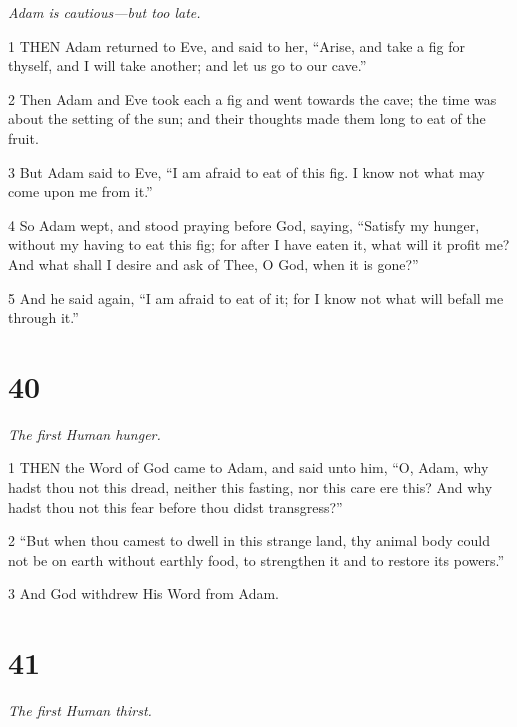 \par \textit{Adam is cautious—but too late.}

\par 1 THEN Adam returned to Eve, and said to her, “Arise, and take a fig for thyself, and I will take another; and let us go to our cave.”

\par 2 Then Adam and Eve took each a fig and went towards the cave; the time was about the setting of the sun; and their thoughts made them long to eat of the fruit.

\par 3 But Adam said to Eve, “I am afraid to eat of this fig. I know not what may come upon me from it.”

\par 4 So Adam wept, and stood praying before God, saying, “Satisfy my hunger, without my having to eat this fig; for after I have eaten it, what will it profit me? And what shall I desire and ask of Thee, O God, when it is gone?”

\par 5 And he said again, “I am afraid to eat of it; for I know not what will befall me through it.”

\chapter{40}

\par \textit{The first Human hunger.}

\par 1 THEN the Word of God came to Adam, and said unto him, “O, Adam, why hadst thou not this dread, neither this fasting, nor this care ere this? And why hadst thou not this fear before thou didst transgress?”

\par 2 “But when thou camest to dwell in this strange land, thy animal body could not be on earth without earthly food, to strengthen it and to restore its powers.”

\par 3 And God withdrew His Word from Adam.

\chapter{41}

\par \textit{The first Human thirst.}

